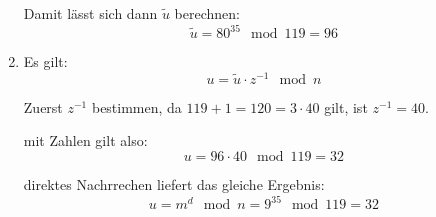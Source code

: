 \documentclass[DIN, pagenumber=false, fontsize=11pt, parskip=half]{scrartcl}
\begin{document}
\begin{enumerate}[label=\alph*)]
            Damit lässt sich dann $\tilde{u}$ berechnen:
            \begin{equation}
                \tilde{u} = 80^{35} \mod 119 = 96
            \end{equation}

        \item 
            Es gilt:
            \begin{equation}
                u = \tilde{u} \cdot z^{-1} \mod n
            \end{equation}

            Zuerst $z^{-1}$ bestimmen, da $119+1=120=3 \cdot 40$ gilt, ist
            $z^{-1} = 40$.

            mit Zahlen gilt also:
            \begin{equation}
                u = 96 \cdot 40 \mod 119 = 32
            \end{equation}

            direktes Nachrrechen liefert das gleiche Ergebnis:
            \begin{equation}
                u = m^d \mod n = 9^{35} \mod 119 = 32
            \end{equation}
    \end{enumerate}

\end{document}
